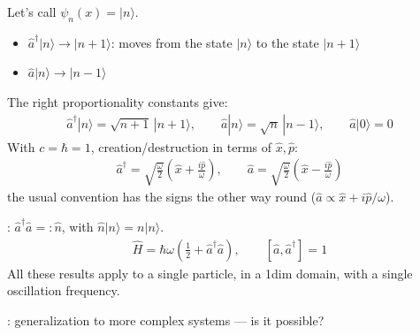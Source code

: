 \documentclass[letterpaper,10pt,english]{jupyterBook}
\begin{document}
\sphinxAtStartPar
{}

\sphinxAtStartPar
Let’s call \(\psi_n(x)=|n\rangle\).
\begin{itemize}
\item {} 
\sphinxAtStartPar
\(\hat a^\dagger|n\rangle\to|n+1\rangle\): moves from the state \(|n\rangle\) to the state \(|n+1\rangle\)

\item {} 
\sphinxAtStartPar
\(\hat a|n\rangle\to|n-1\rangle\)

\end{itemize}

\sphinxAtStartPar
The right proportionality constants give:
\begin{equation*}
\begin{split}
\hat a^\dagger|n\rangle=\sqrt{n+1}\,|n+1\rangle,\qquad
\hat a|n\rangle=\sqrt{n}\,|n-1\rangle,\qquad
\hat a|0\rangle=0
\end{split}
\end{equation*}
\sphinxAtStartPar
With \(c=\hbar=1\), creation/destruction in terms of \(\hat x,\hat p\):
\begin{equation*}
\begin{split}
\hat a^\dagger=\sqrt{\tfrac{\omega}{2}}\left(\hat x+\tfrac{i\hat p}{\omega}\right),\qquad
\hat a=\sqrt{\tfrac{\omega}{2}}\left(\hat x-\tfrac{i\hat p}{\omega}\right)
\end{split}
\end{equation*}
\sphinxAtStartPar
\sphinxstylestrong{{[}check{]}} the usual convention has the signs the other way round (\(\hat a\propto \hat x+i\hat p/\omega\)).

\sphinxAtStartPar
{}: \(\hat a^\dagger\hat a=:\hat n\), with \(\hat n|n\rangle=n|n\rangle\).
\begin{equation*}
\begin{split}
\hat H=\hbar\omega\left(\tfrac12+\hat a^\dagger\hat a\right),\qquad [\hat a,\hat a^\dagger]=1
\end{split}
\end{equation*}
\sphinxAtStartPar
All these results apply to a single particle, in a 1\sphinxhyphen{}dim domain, with a single oscillation frequency.

\sphinxAtStartPar
{}: generalization to more complex systems — is it possible?

\sphinxstepscope
\end{document}
